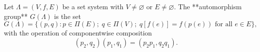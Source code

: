 Let $\Lambda = (V, f, E)$ be a set system with $V \neq \varnothing$ or $E \neq \varnothing$. The **automorphism group** $G(\Lambda)$ is the set
$$G(\Lambda) = \{(p, q) : p \in \Pi(E);\; q \in \Pi(V);\; q[f(e)] = f(p(e)) \text{ for all } e \in E\},$$
with the operation of componentwise composition
$$(p_2, q_2)(p_1, q_1) = (p_2p_1, q_2q_1).$$
